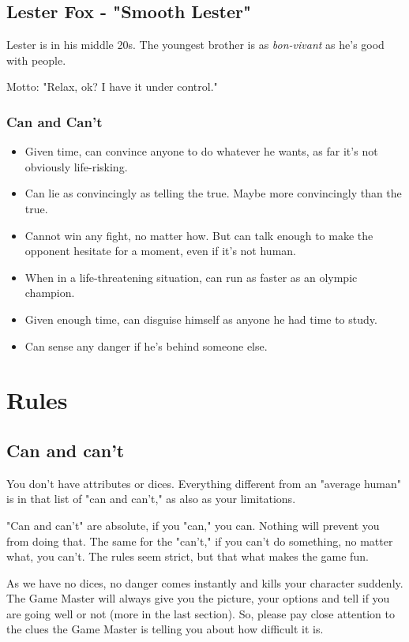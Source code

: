 \documentclass[11pt]{article}
\begin{document}
\subsection{Lester Fox - "Smooth Lester"}
\label{sec:orgbd708ab}
Lester is in his middle 20s. The youngest brother is as \emph{bon-vivant} as he's good with people.

Motto: "Relax, ok? I have it under control."

\subsubsection{Can and Can't}
\label{sec:org2925e14}
\begin{itemize}
\item Given time, can convince anyone to do whatever he wants, as far it's not obviously life-risking.
\item Can lie as convincingly as telling the true. Maybe more convincingly than the true.
\item Cannot win any fight, no matter how. But can talk enough to make the opponent hesitate for a moment, even if it's not human.
\item When in a life-threatening situation, can run as faster as an olympic champion.
\item Given enough time, can disguise himself as anyone he had time to study.
\item Can sense any danger if he's behind someone else.
\end{itemize}

\section{Rules}
\label{sec:org134220e}
\subsection{Can and can't}
\label{sec:org2594811}
You don't have attributes or dices. Everything different from an "average human" is in that list of "can and can't," as also as your limitations.

"Can and can't" are absolute, if you "can," you can. Nothing will prevent you from doing that. The same for the "can't," if you can't do something, no matter what, you can't. The rules seem strict, but that what makes the game fun.

As we have no dices, no danger comes instantly and kills your character suddenly. The Game Master will always give you the picture, your options and tell if you are going well or not (more in the last section). So, please pay close attention to the clues the Game Master is telling you about how difficult it is.
\end{document}
